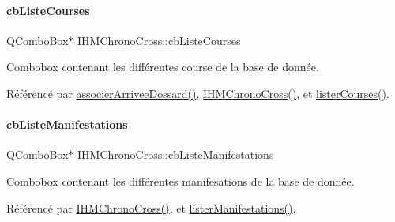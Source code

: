 \mbox{\label{class_i_h_m_chrono_cross_af47891e3e9f2bb2c955be8c128e830b5}} 
\paragraph{\texorpdfstring{cb\+Liste\+Courses}{cbListeCourses}}
{\footnotesize\ttfamily Q\+Combo\+Box$\ast$ I\+H\+M\+Chrono\+Cross\+::cb\+Liste\+Courses\hspace{0.3cm}{\ttfamily [private]}}



Combobox contenant les différentes course de la base de donnée. 



Référencé par \hyperlink{class_i_h_m_chrono_cross_a9f7f1ad130b60300a879694b6234f161}{associer\+Arrivee\+Dossard()}, \hyperlink{class_i_h_m_chrono_cross_a479fc90733fba3e65fb06aa4a3adc02e}{I\+H\+M\+Chrono\+Cross()}, et \hyperlink{class_i_h_m_chrono_cross_a1b9f117d7097b63ddabe168a5349a7e8}{lister\+Courses()}.

\mbox{\label{class_i_h_m_chrono_cross_a4b7a6af527d8d2d28d8ea6ea7cbfac75}} 
\paragraph{\texorpdfstring{cb\+Liste\+Manifestations}{cbListeManifestations}}
{\footnotesize\ttfamily Q\+Combo\+Box$\ast$ I\+H\+M\+Chrono\+Cross\+::cb\+Liste\+Manifestations\hspace{0.3cm}{\ttfamily [private]}}



Combobox contenant les différentes manifesations de la base de donnée. 



Référencé par \hyperlink{class_i_h_m_chrono_cross_a479fc90733fba3e65fb06aa4a3adc02e}{I\+H\+M\+Chrono\+Cross()}, et \hyperlink{class_i_h_m_chrono_cross_adb47e6ee9c2a917a6df77b64930c3c48}{lister\+Manifestations()}.

\mbox{\label{class_i_h_m_chrono_cross_a49236628e14e516e1ab7a181eac8fea8}} 
